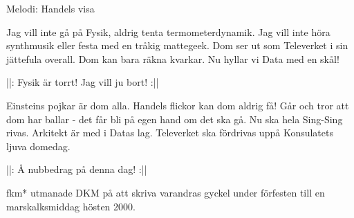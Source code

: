 \begin{song}

\begin{songmeta}
Melodi: Handels visa
\end{songmeta}

\begin{songtext}
Jag vill inte gå på Fysik,
aldrig tenta termometerdynamik.
Jag vill inte höra synthmusik
eller festa med en tråkig mattegeek.
Dom ser ut som Televerket
i sin jättefula overall.
Dom kan bara räkna kvarkar.
Nu hyllar vi Data med en skål!

||: Fysik är torrt! \textendash{} Jag vill ju bort! :||

Einsteins pojkar är dom alla.
Handels flickor kan dom aldrig få!
Går och tror att dom har ballar
- det får bli på egen hand om det ska gå.
Nu ska hela Sing-Sing rivas.
Arkitekt är med i Datas lag.
Televerket ska fördrivas
uppå Konsulatets ljuva domedag.

||: Å nubbedrag \textendash{} på denna dag! :||
\end{songtext}

\begin{songnotes}
fkm* utmanade DKM på att skriva varandras gyckel under förfesten till en marskalksmiddag hösten 2000.
\end{songnotes}

\end{song}
